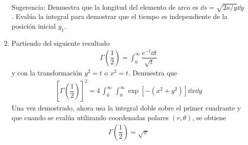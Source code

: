 \begin{enumerate}
\begin{align*}
\end{align*}
Sugerencia: Demuestra que la longitud del elemento de arco es $\dd{s} = \sqrt{2a/y} \dd{y}$. Evalúa la integral para demostrar que el tiempo es independiente de la posición inicial $y_{1}$.
\item Partiendo del siguiente resultado
\begin{align*}
\Gamma \left( \dfrac{1}{2} \right) = \int_{0}^{\infty} \dfrac{e^{-t} \dd{t}}{\sqrt{t}}
\end{align*}
y con la transformación $y^{2} = t$ o $x^{2}=t$. Demuestra que
\begin{align*}
\left[ \Gamma \left( \dfrac{1}{2} \right) \right]^{2} = 4 \,  \int_{0}^{\infty} \, \int_{0}^{\infty} \exp[-(x^{2} + y^{2})] \dd{x} \dd{y}
\end{align*}
Una vez demostrado, ahora usa la integral doble sobre el primer cuadrante y que cuando se evalúa utilizando coordenadas polares $(r, \theta)$, se obtiene
\begin{align*}
\Gamma \left( \dfrac{1}{2} \right) = \sqrt{\pi}
\end{align*}
\end{enumerate}

